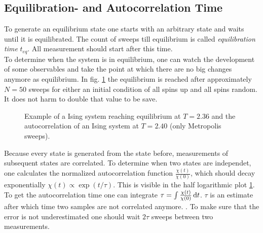 \subsection{Equilibration- and Autocorrelation Time}
\label{ssec:eqtime}
    To generate an equilibrium state one starts with an arbitrary state
    and waits until it is equilibrated. The count of sweeps till
    equilibrium is called \emph{equilibration time} \(t_{eq}\).
    All measurement should start after this time.\\
    To determine when the system is in equilibrium, one can watch the
    development of some observables and take the point at which there
    are no big changes anymore as equilibrium. In fig.
    \ref{fig:equiandauto}
    the equilibrium is reached after approximately \(N=50\) sweeps for
    either an initial condition of all spins up and all spins random. It
    does not harm to double that value to be save.
    \begin{figure}[htbp]
        \centering
        \caption[Examples for equilibration and autocorrelation]
                { Example of a Ising
                    system reaching equilibrium at \(T=2.36\) and
                  the
                    autocorrelation of an Ising system at \(T=2.40\)
                    (only Metropolis sweeps).
                }
        \label{fig:equiandauto}
    \end{figure}

    Because every state is generated from the state before, measurements
    of subsequent states are correlated. To determine when two states
    are independet, one calculates the normalized autocorrelation function
    \(\frac{\chi(t)}{\chi(0)}\), which should decay exponentially
    \(\chi(t) \propto \exp(t/\tau)\). This is visible in the half
    logarithmic plot \ref{fig:equiandauto}.
    To get the autocorrelation time one can integrate \(\tau = \int \frac{\chi(t)}{\chi(0)} \,\mathrm{d} t\).
    \(\tau\) is an estimate after which time two samples are not
    correlated anymore. \cite[S. ??]{NewmanBarkema1999} \cite[S. 150f]{Katzgraber2011}.
    To make sure that the error is not underestimated one should wait
    \(2\tau\) sweeps between two measurements.

